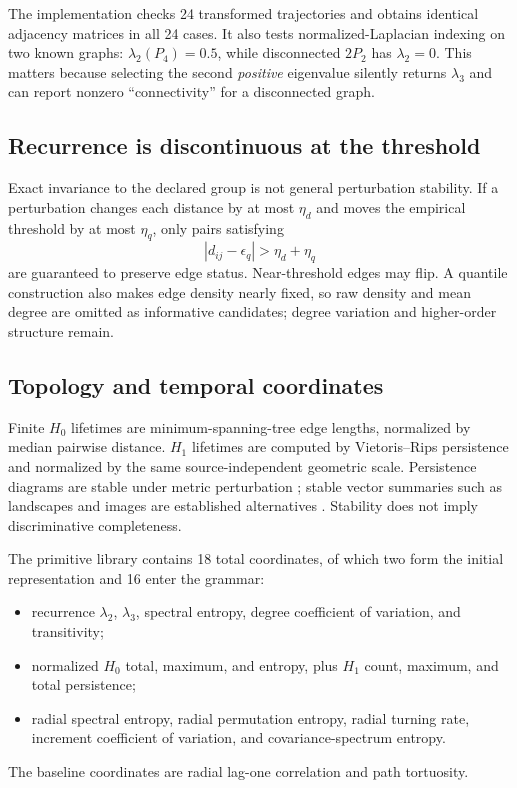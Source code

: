 \documentclass[10pt]{article}
\theoremstyle{definition}
\theoremstyle{remark}
\begin{document}
The implementation checks 24 transformed trajectories and obtains identical adjacency matrices in all 24 cases. It also tests normalized-Laplacian indexing on two known graphs: $\lambda_2(P_4)=0.5$, while disconnected $2P_2$ has $\lambda_2=0$. This matters because selecting the second \emph{positive} eigenvalue silently returns $\lambda_3$ and can report nonzero ``connectivity'' for a disconnected graph.

\subsection{Recurrence is discontinuous at the threshold}

Exact invariance to the declared group is not general perturbation stability. If a perturbation changes each distance by at most $\eta_d$ and moves the empirical threshold by at most $\eta_q$, only pairs satisfying
\begin{equation}
  |d_{ij}-\epsilon_q|>\eta_d+\eta_q
  \label{eq:margin}
\end{equation}
are guaranteed to preserve edge status. Near-threshold edges may flip. A quantile construction also makes edge density nearly fixed, so raw density and mean degree are omitted as informative candidates; degree variation and higher-order structure remain.

\subsection{Topology and temporal coordinates}

Finite $H_0$ lifetimes are minimum-spanning-tree edge lengths, normalized by median pairwise distance. $H_1$ lifetimes are computed by Vietoris--Rips persistence and normalized by the same source-independent geometric scale. Persistence diagrams are stable under metric perturbation \citep{CohenSteiner2007,Chazal2014}; stable vector summaries such as landscapes and images are established alternatives \citep{Bubenik2015,Adams2017}. Stability does not imply discriminative completeness.

The primitive library contains 18 total coordinates, of which two form the initial representation and 16 enter the grammar:
\begin{itemize}
\item recurrence $\lambda_2$, $\lambda_3$, spectral entropy, degree coefficient of variation, and transitivity;
\item normalized $H_0$ total, maximum, and entropy, plus $H_1$ count, maximum, and total persistence;
\item radial spectral entropy, radial permutation entropy, radial turning rate, increment coefficient of variation, and covariance-spectrum entropy.
\end{itemize}
The baseline coordinates are radial lag-one correlation and path tortuosity.
\end{document}
